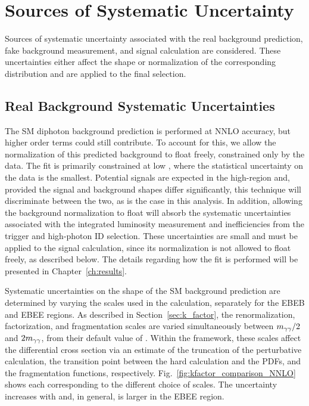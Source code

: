 \chapter{Sources of Systematic Uncertainty}\label{ch:systematics}

Sources of systematic uncertainty associated with the real background prediction, fake background measurement, and signal calculation are considered. These uncertainties either affect the shape or normalization of the corresponding distribution and are applied to the final selection.

\section{Real Background Systematic Uncertainties}

The SM diphoton background prediction is performed at NNLO accuracy, but higher order terms could still contribute. To account for this, we allow the normalization of this predicted background to float freely, constrained only by the data. The fit is primarily constrained at low \mgg, where the statistical uncertainty on the data is the smallest. Potential signals are expected in the high-\mgg region and, provided the signal and background shapes differ significantly, this technique will discriminate between the two, as is the case in this analysis. In addition, allowing the background normalization to float will absorb the systematic uncertainties associated with the integrated luminosity measurement and inefficiencies from the trigger and high-\pt photon ID selection. These uncertainties are small and must be applied to the signal calculation, since its normalization is not allowed to float freely, as described below. The details regarding how the fit is performed will be presented in Chapter~\ref{ch:results}.

Systematic uncertainties on the shape of the SM background prediction are determined by varying the scales used in the \Kfactor calculation, separately for the EBEB and EBEE regions. As described in Section~\ref{sec:k_factor}, the renormalization, factorization, and fragmentation scales are varied simultaneously between $m_{\gamma\gamma}/2$ and $2m_{\gamma\gamma}$, from their default value of \mgg. Within the \MCFM framework, these scales affect the differential cross section via an estimate of the truncation of the perturbative calculation, the transition point between the hard calculation and the PDFs, and the fragmentation functions, respectively. Fig.~\ref{fig:kfactor_comparison_NNLO} shows each \Kfactor corresponding to the different choice of scales. The uncertainty increases with \mgg and, in general, is larger in the EBEE region.

